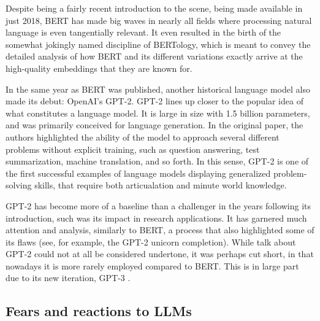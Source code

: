 Despite being a fairly recent introduction to the scene, being made available in just 2018, BERT has made big waves in nearly all fields where processing natural language is even tangentially relevant.
It even resulted in the birth of the somewhat jokingly named discipline of BERTology, which is meant to convey the detailed analysis of how BERT and its different variations exactly arrive at the high-quality embeddings that they are known for.

In the same year as BERT was published, another historical language model also made its debut: OpenAI's GPT-2. \citep{citationneeded}
GPT-2 lines up closer to the popular idea of what constitutes a language model. It is large in size with 1.5 billion parameters, and was primarily conceived for language generation.
In the original paper, the authors highlighted the ability of the model to approach several different problems without explicit training, such as question answering, test summarization, machine translation, and so forth.
In this sense, GPT-2 is one of the first successful examples of language models displaying generalized problem-solving skills, that require both articualation and minute world knowledge.

GPT-2 has become more of a baseline than a challenger in the years following its introduction, such was its impact in research applications. It has garnered much attention and analysis, similarly to BERT, a process that also highlighted some of its flaws (see, for example, the GPT-2 unicorn completion). While talk about GPT-2 could not at all be considered undertone, it was perhaps cut short, in that nowadays it is more rarely employed compared to BERT. This is in large part due to its new iteration, GPT-3 \citep{citationneeded}.


\subsection{Fears and reactions to LLMs}
